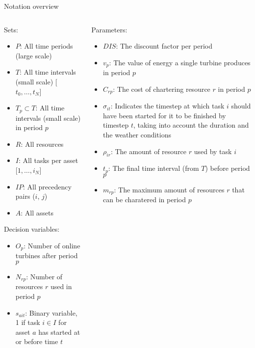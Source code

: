 \documentclass{beamer}
\begin{document}
\begin{frame}{Notation overview}
\scriptsize

\begin{columns}
\begin{column}{.48\textwidth}
Sets:
\begin{itemize}
\item $P$: All time periods (large scale)
\item $T$: All time intervals (small scale) [$t_0, \dots , t_N$]
\item $T_p \subset T$: All time intervals (small scale) in period $p$
\item $R$: All resources
\item $I$:  All tasks per asset [$1, \dots , i_N$]
\item $IP$: All precedency pairs ($i$, $j$)
\item $A$: All assets
\end{itemize}

Decision variables:
\begin{itemize}
\item $O_{p}$: Number of online turbines after period $p$
\item $N_{rp}$: Number of resources $r$ used in period $p$
\item $s_{ait}$: Binary variable, 1 if task $i \in I$ for asset $a$ has started at or before time $t$
\end{itemize}
\end{column}

\hfill

\begin{column}{.48\textwidth}
Parameters:
\begin{itemize}
\item $DIS$: The discount factor per period
\item $v_p$: The value of energy a single turbine produces in period $p$
\item $C_{rp}$: The cost of chartering resource $r$ in period $p$
\item $\sigma_{it}$: Indicates the timestep at which task $i$ should have been started for it to be finished by timestep $t$, taking into account the duration and the weather conditions
\item $\rho_{ir}$: The amount of resource $r$ used by task $i$
\item $t_p$: The final time interval (from $T$) before period $p$
\item $m_{rp}$: The maximum amount of resources $r$ that can be charatered in period $p$
\end{itemize}
\end{column}
\end{columns}

\end{frame}
\end{document}
